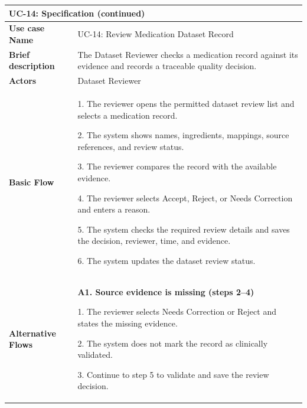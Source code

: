 \begin{longtable}{|p{}|p{}|}
\hline
\endfirsthead
\multicolumn{2}{l}{\textbf{UC-14: Specification (continued)}} \\
\hline
\endhead
\textbf{Use case Name} & UC-14: Review Medication Dataset Record \\ \hline
\textbf{Brief description} & The Dataset Reviewer checks a medication record against its evidence and records a traceable quality decision. \\ \hline
\textbf{Actors} & Dataset Reviewer \\ \hline
\textbf{Basic Flow} &
1. The reviewer opens the permitted dataset review list and selects a medication record.\par
2. The system shows names, ingredients, mappings, source references, and review status.\par
3. The reviewer compares the record with the available evidence.\par
4. The reviewer selects Accept, Reject, or Needs Correction and enters a reason.\par
5. The system checks the required review details and saves the decision, reviewer, time, and evidence.\par
6. The system updates the dataset review status.
\\ \hline
\textbf{Alternative Flows} &

\textbf{A1. Source evidence is missing (steps 2--4)}\par
1. The reviewer selects Needs Correction or Reject
and states the missing evidence.\par
2. The system does not mark the record as
clinically validated.\par
3. Continue to step 5 to validate and save
the review decision.


\end{longtable}
